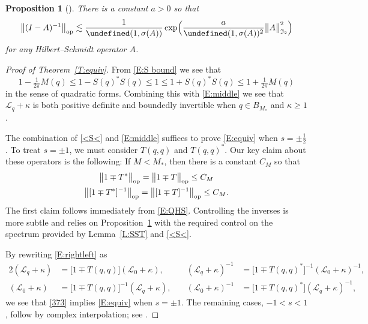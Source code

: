 \documentclass{amsart}
\numberwithin{equation}{section}
\newtheorem{proposition}[theorem]{Proposition}
\theoremstyle{definition}
\newcommand{\sg}{\sigma}
\newcommand{\ka}{\kappa}
\newcommand{\Lc}{\mathcal{L}}
\newcommand{\I}{\mathfrak{I}}
\newcommand{\f}{\frac}
\let\dist=\undefined\DeclareMathOperator{\dist}{dist}
\newcommand{\op}{\text{\upshape op}}
\begin{document}
\begin{proposition}[\cite{Bandtlow}]\label{P:Bandtlow}
There is a constant $a>0$ so that  
$$
\bigl\|(I-A)^{-1}\bigr\|_\op \lesssim \f{1}{\dist(1,\sg(A))}\exp\Bigl(\f{a}{\dist(1,\sigma(A))^2} \bigl\|A\bigr\|_{\I_2}^2 \Bigr)
$$
for any Hilbert--Schmidt operator $A$.
\end{proposition}


\begin{proof}[Proof of Theorem~\ref{T:equiv}]
From \eqref{E:S bound} we see that
\begin{equation}\label{<S<}
1-\tfrac{1}{2\pi}M(q) \leq 1 - S(q)^* S(q) \leq 1 \leq 1 + S(q)^* S(q) \leq 1+\tfrac{1}{2\pi}M(q)
\end{equation}
in the sense of quadratic forms.  Combining this with \eqref{E:middle} we see that $\Lc_q+\kappa$ is both positive definite and boundedly invertible when $q\in B_{M_*}$ and $\kappa\geq 1$.

The combination of \eqref{<S<} and \eqref{E:middle} suffices to prove \eqref{E:equiv} when $s=\pm\frac12$.  To treat $s=\pm1$, we must consider $T(q,q)$ and $T(q,q)^*$.  Our key claim about these operators is the following: If $M<M_*$, then there is a constant $C_M$ so that 
\begin{equation}\label{373}\begin{gathered}
\bigl\| 1 \mp T^*\bigr\|_\op  =  \bigl\| 1 \mp T \bigr\|_\op \leq C_M \\
\bigl\| [1 \mp T^*]^{-1} \bigr\|_\op  =  \bigl\| [1 \mp T]^{-1} \bigr\|_\op \leq C_M.
\end{gathered}\end{equation}
The first claim follows immediately from \eqref{E:QHS}.  Controlling the inverses is more subtle and relies on Proposition~\ref{P:Bandtlow} with the required control on the spectrum provided by Lemma~\ref{L:SST} and \eqref{<S<}.

By rewriting \eqref{E:rightleft} as
\begin{alignat*}{2}
(\Lc_q+\ka)&=\bigl[1\mp T(q,q)\bigr] (\Lc_0+\ka),
	\quad& (\Lc_q+\ka)^{-1}&=\bigl[1\mp T(q,q)^*\bigr]^{-1} (\Lc_0+\ka)^{-1}, \\
(\Lc_0+\ka) &= \bigl[1\mp T(q,q)\bigr]^{-1} (\Lc_q+\ka),
	\quad& (\Lc_0+\ka)^{-1} &= \bigl[1\mp T(q,q)^*\bigr] (\Lc_q+\ka)^{-1}, 
\end{alignat*}
we see that \eqref{373} implies \eqref{E:equiv} when $s=\pm1$. The remaining cases, $-1<s<1$,  follow by complex interpolation; see \cite[Ch.~1]{LionsMagenes}.
\end{proof}
\end{document}
